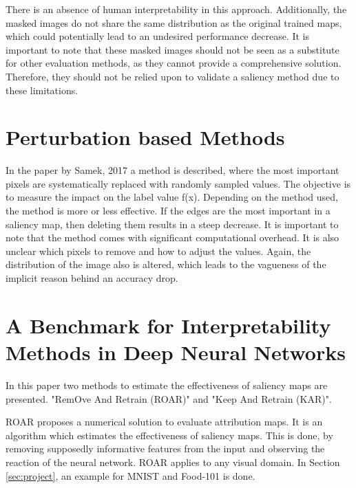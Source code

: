 There is an absence of human interpretability in this approach. Additionally, the masked images do not share the same distribution as the original trained maps, which could potentially lead to an undesired performance decrease. It is important to note that these masked images should not be seen as a substitute for other evaluation methods, as they cannot provide a comprehensive solution. Therefore, they should not be relied upon to validate a saliency method due to these limitations.

\section{Perturbation based Methods}
\label{pertubation}

In the paper by Samek, 2017 \cite{samek2017} a method is described, where the most important pixels are systematically replaced with randomly sampled values. The objective is to measure the impact on the label value f(x). Depending on the method used, the method is more or less effective. If the edges are the most important in a saliency map, then deleting them results in a steep decrease.
It is important to note that the method comes with significant computational overhead. It is also unclear which pixels to remove and how to adjust the values. Again, the distribution of the image also is altered, which leads to the vagueness of the implicit reason behind an accuracy drop.

\section{A Benchmark for Interpretability Methods in Deep Neural Networks }

In this paper \cite{hooker2019benchmark} two methods to estimate the effectiveness of saliency maps are presented. "RemOve And Retrain (ROAR)" and "Keep And Retrain (KAR)". 

ROAR proposes a numerical solution to evaluate attribution maps. It is an algorithm which estimates the effectiveness of saliency maps. This is done, by removing supposedly informative features from the input and observing the reaction of the neural network. ROAR applies to any visual domain. In Section \ref{sec:project}, an example for MNIST and Food-101 is done.


